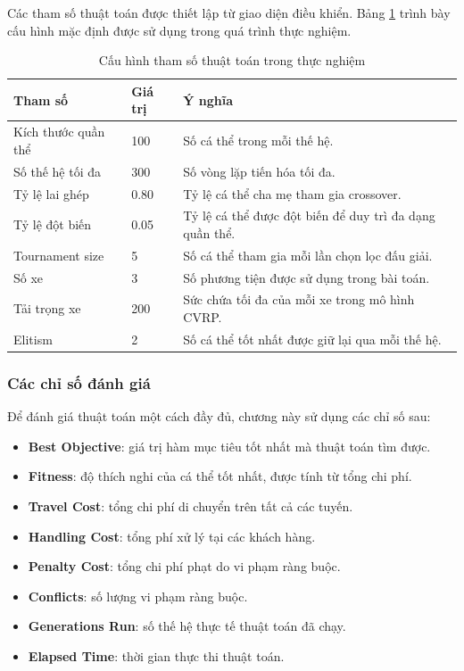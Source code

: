 \documentclass[12pt,a4paper]{article}
\numberwithin{figure}{subsection}
\begin{document}
Các tham số thuật toán được thiết lập từ giao diện điều khiển. Bảng \ref{tab:experiment_config} trình bày cấu hình mặc định được sử dụng trong quá trình thực nghiệm.

\begin{table}[H]
    \centering
    \caption{Cấu hình tham số thuật toán trong thực nghiệm}
    \label{tab:experiment_config}
    \renewcommand{\arraystretch}{1.35}
    \begin{tabular}{|p{5cm}|p{3cm}|p{6cm}|}
        \hline
        \textbf{Tham số} & \textbf{Giá trị} & \textbf{Ý nghĩa} \\
        \hline
        Kích thước quần thể & 100 & Số cá thể trong mỗi thế hệ. \\
        \hline
        Số thế hệ tối đa & 300 & Số vòng lặp tiến hóa tối đa. \\
        \hline
        Tỷ lệ lai ghép & 0.80 & Tỷ lệ cá thể cha mẹ tham gia crossover. \\
        \hline
        Tỷ lệ đột biến & 0.05 & Tỷ lệ cá thể được đột biến để duy trì đa dạng quần thể. \\
        \hline
        Tournament size & 5 & Số cá thể tham gia mỗi lần chọn lọc đấu giải. \\
        \hline
        Số xe & 3 & Số phương tiện được sử dụng trong bài toán. \\
        \hline
        Tải trọng xe & 200 & Sức chứa tối đa của mỗi xe trong mô hình CVRP. \\
        \hline
        Elitism & 2 & Số cá thể tốt nhất được giữ lại qua mỗi thế hệ. \\
        \hline
    \end{tabular}
\end{table}

\subsubsection{Các chỉ số đánh giá}

Để đánh giá thuật toán một cách đầy đủ, chương này sử dụng các chỉ số sau:

\begin{itemize}[label={$\circ$}, leftmargin=1.5cm]
    \item \textbf{Best Objective}: giá trị hàm mục tiêu tốt nhất mà thuật toán tìm được.
    \item \textbf{Fitness}: độ thích nghi của cá thể tốt nhất, được tính từ tổng chi phí.
    \item \textbf{Travel Cost}: tổng chi phí di chuyển trên tất cả các tuyến.
    \item \textbf{Handling Cost}: tổng phí xử lý tại các khách hàng.
    \item \textbf{Penalty Cost}: tổng chi phí phạt do vi phạm ràng buộc.
    \item \textbf{Conflicts}: số lượng vi phạm ràng buộc.
    \item \textbf{Generations Run}: số thế hệ thực tế thuật toán đã chạy.
    \item \textbf{Elapsed Time}: thời gian thực thi thuật toán.
\end{itemize}
\end{document}
